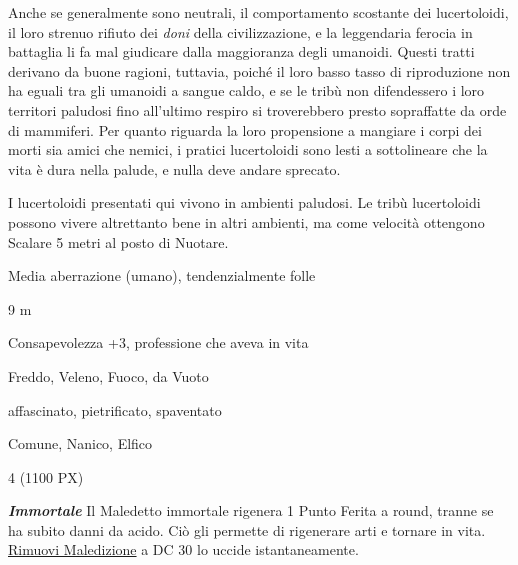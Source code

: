 \begin{multicols}{2}
{Anche se generalmente sono neutrali, il comportamento scostante dei lucertoloidi, il loro strenuo rifiuto dei \emph{doni} della civilizzazione, e la leggendaria ferocia in battaglia li fa mal giudicare dalla maggioranza degli umanoidi. Questi tratti derivano da buone ragioni, tuttavia, poiché il loro basso tasso di riproduzione non ha eguali tra gli umanoidi a sangue caldo, e se le tribù non difendessero i loro territori paludosi fino all'ultimo respiro si troverebbero presto sopraffatte da orde di mammiferi. Per quanto riguarda la loro propensione a mangiare i corpi dei morti sia amici che nemici, i pratici lucertoloidi sono lesti a sottolineare che la vita è dura nella palude, e nulla deve andare sprecato.

I lucertoloidi presentati qui vivono in ambienti paludosi. Le tribù lucertoloidi possono vivere altrettanto bene in altri ambienti, ma come velocità ottengono Scalare 5 metri al posto di Nuotare.


\begin{description}[noitemsep, topsep=0pt, parsep=0pt, partopsep=0pt, itemsep=1pt, leftmargin=2.35cm,  labelwidth=2.2cm, itemindent=0cm, listparindent=0pt] %
\setlength{\baselineskip}{10pt}
\item[\textbf{Taglia/Tipo}] Media aberrazione (umano), tendenzialmente folle
\item[\textbf{Caratt.}] 
\item[\textbf{Punti Ferita}] 
\item[\textbf{Movimento}] 9 m
\item[\textbf{Tiri Salvez.}] 
\item[\textbf{Comp.}] Consapevolezza +3, professione che aveva in vita
\item[\textbf{Imm. Danni}] Freddo, Veleno, Fuoco, da Vuoto
\item[\textbf{Immunità}] affascinato, pietrificato, spaventato
\item[\textbf{Linguaggi}] Comune, Nanico, Elfico
\item[\textbf{Sfida}] 4 (1100 PX)
\end{description}
\smallskip

\emph{\textbf{Immortale}} Il Maledetto immortale rigenera 1 Punto Ferita a round, tranne se ha subito danni da acido. Ciò gli permette di rigenerare arti e tornare in vita. \hyperlink{Rimuovi Maledizione}{Rimuovi Maledizione} a DC 30 lo uccide istantaneamente.

}
\end{multicols}
